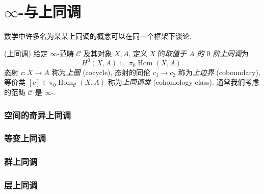 \chapter{$\infty$-\topos{}与上同调}

数学中许多名为某某上同调的概念可以在同一个框架下谈论.

\begin{definition}
	{(上同调)}
	给定 $\infty$-范畴 $\mathcal C$ 及其对象 $X,A$, 定义 $X$ 的\emph{取值于 $A$ 的 $0$ 阶上同调}为
	$$
	H^0(X,A):=\pi_0\operatorname{Hom}(X,A).
	$$
	态射 $c\colon X\to A$ 称为\emph{上圈} (cocycle),
	态射的同伦 $c_1\to c_2$ 称为\emph{上边界} (coboundary),
	等价类 $[c]\in\pi_0\operatorname{Hom}_{\mathcal C}(X,A)$ 称为\emph{上同调类} (cohomology class). 通常我们考虑的范畴 $\mathcal C$ 是 $\infty$-\topos{}.
\end{definition}

\subsection{空间的奇异上同调}





\subsection{等变上同调}


\subsection{群上同调}


\subsection{层上同调}
